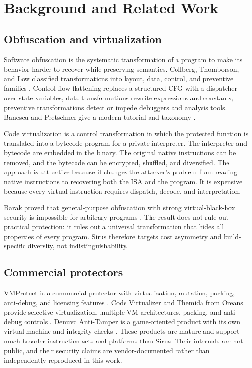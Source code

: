\section{Background and Related Work}
\label{sec:background}

\subsection{Obfuscation and virtualization}

Software obfuscation is the systematic transformation of a program to make its
behavior harder to recover while preserving semantics. Collberg, Thomborson, and
Low classified transformations into layout, data, control, and preventive
families \cite{collberg1997,collberg2002}. Control-flow flattening replaces a
structured CFG with a dispatcher over state variables; data transformations
rewrite expressions and constants; preventive transformations detect or impede
debuggers and analysis tools. Banescu and Pretschner give a modern tutorial and
taxonomy \cite{banescu2018}.

Code virtualization is a control transformation in which the protected function
is translated into a bytecode program for a private interpreter. The interpreter
and bytecode are embedded in the binary. The original native instructions can be
removed, and the bytecode can be encrypted, shuffled, and diversified. The
approach is attractive because it changes the attacker's problem from reading
native instructions to recovering both the ISA and the program. It is expensive
because every virtual instruction requires dispatch, decode, and interpretation.

Barak \etal{} proved that general-purpose obfuscation with strong
virtual-black-box security is impossible for arbitrary programs
\cite{barak2012}. The result does not rule out practical protection: it rules out
a universal transformation that hides all properties of every program. Sirus
therefore targets cost asymmetry and build-specific diversity, not
indistinguishability.

\subsection{Commercial protectors}

VMProtect is a commercial protector with virtualization, mutation, packing,
anti-debug, and licensing features \cite{vmprotect}. Code Virtualizer and Themida
from Oreans provide selective virtualization, multiple VM architectures, packing,
and anti-debug controls \cite{codevirtualizer,themida}. Denuvo Anti-Tamper is a
game-oriented product with its own virtual machine and integrity checks
\cite{denuvo}. These products are mature and support much broader instruction
sets and platforms than Sirus. Their internals are not public, and their security
claims are vendor-documented rather than independently reproduced in this work.

